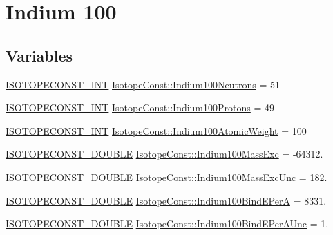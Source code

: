 \hypertarget{group___isotope_const-_indium-_in100}{}\section{Indium 100}
\label{group___isotope_const-_indium-_in100}
\subsection*{Variables}
\begin{DoxyCompactItemize}
\item 
\mbox{\hyperlink{group___isotope_const-_macros_ga5f18360b3e99483a35c32d789e62621c}{I\+S\+O\+T\+O\+P\+E\+C\+O\+N\+S\+T\+\_\+\+I\+NT}} \mbox{\hyperlink{group___isotope_const-_indium-_in100_ga50ba37dc024975c722ab70b477c7c37c}{Isotope\+Const\+::\+Indium100\+Neutrons}} = 51
\item 
\mbox{\hyperlink{group___isotope_const-_macros_ga5f18360b3e99483a35c32d789e62621c}{I\+S\+O\+T\+O\+P\+E\+C\+O\+N\+S\+T\+\_\+\+I\+NT}} \mbox{\hyperlink{group___isotope_const-_indium-_in100_gafabb6ad123c8ab5de8372a4845f248ef}{Isotope\+Const\+::\+Indium100\+Protons}} = 49
\item 
\mbox{\hyperlink{group___isotope_const-_macros_ga5f18360b3e99483a35c32d789e62621c}{I\+S\+O\+T\+O\+P\+E\+C\+O\+N\+S\+T\+\_\+\+I\+NT}} \mbox{\hyperlink{group___isotope_const-_indium-_in100_gaca6fa61b2534d783586ec0916de1a2db}{Isotope\+Const\+::\+Indium100\+Atomic\+Weight}} = 100
\item 
\mbox{\hyperlink{group___isotope_const-_macros_ga8f45a7272ce02c0b4c65c44636ed719a}{I\+S\+O\+T\+O\+P\+E\+C\+O\+N\+S\+T\+\_\+\+D\+O\+U\+B\+LE}} \mbox{\hyperlink{group___isotope_const-_indium-_in100_gadc8bdf7d94e93eb585dde00a03ae4836}{Isotope\+Const\+::\+Indium100\+Mass\+Exc}} = -\/64312.
\item 
\mbox{\hyperlink{group___isotope_const-_macros_ga8f45a7272ce02c0b4c65c44636ed719a}{I\+S\+O\+T\+O\+P\+E\+C\+O\+N\+S\+T\+\_\+\+D\+O\+U\+B\+LE}} \mbox{\hyperlink{group___isotope_const-_indium-_in100_ga7961a09ce4a3df934ab0c12cdbfbfb22}{Isotope\+Const\+::\+Indium100\+Mass\+Exc\+Unc}} = 182.
\item 
\mbox{\hyperlink{group___isotope_const-_macros_ga8f45a7272ce02c0b4c65c44636ed719a}{I\+S\+O\+T\+O\+P\+E\+C\+O\+N\+S\+T\+\_\+\+D\+O\+U\+B\+LE}} \mbox{\hyperlink{group___isotope_const-_indium-_in100_ga917226ad080249fc497beea8b777f0a8}{Isotope\+Const\+::\+Indium100\+Bind\+E\+PerA}} = 8331.
\item 
\mbox{\hyperlink{group___isotope_const-_macros_ga8f45a7272ce02c0b4c65c44636ed719a}{I\+S\+O\+T\+O\+P\+E\+C\+O\+N\+S\+T\+\_\+\+D\+O\+U\+B\+LE}} \mbox{\hyperlink{group___isotope_const-_indium-_in100_gad857a875417b0ae2a0e69530f0f98c64}{Isotope\+Const\+::\+Indium100\+Bind\+E\+Per\+A\+Unc}} = 1.

\end{DoxyCompactItemize}
